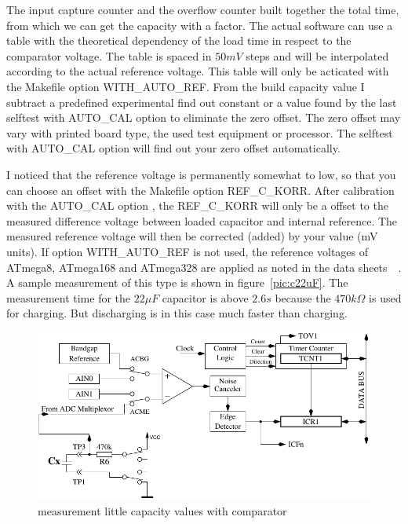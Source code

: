The input capture counter and the overflow counter built together the total time,
from which we can get the capacity with a factor.
The actual software can use a table with the theoretical  dependency of the load time in respect to the comparator voltage.
The table is spaced in \(50mV\) steps and will be interpolated according to the actual reference voltage. 
This table will only be acticated with the Makefile option WITH\_AUTO\_REF.
From the build capacity value I subtract a predefined experimental find out constant or a value found by the last selftest
with AUTO\_CAL option to eliminate the zero offset. 
The zero offset may vary with printed board type, the used test equipment or processor.
The selftest with AUTO\_CAL option will find out your zero offset automatically.

I noticed that the reference voltage is permanently somewhat to low,
 so that you can choose an offset with the Makefile option REF\_C\_KORR.
After calibration with the AUTO\_CAL option , the REF\_C\_KORR will only be a offset to the measured difference voltage
between loaded capacitor and internal reference.
The measured reference voltage will then be corrected (added) by your value (mV units).
If option WITH\_AUTO\_REF is not used, the reference voltages of ATmega8, ATmega168 and ATmega328
are applied as noted in the data sheets~\cite{ATmega8}~\cite{ATmega168}. 
A sample measurement of this type is shown in figure~\ref{pic:c22uF}.
The measurement time for the \(22\mu F\) capacitor is above \(2.6s\) because the \(470k\Omega\) is
used for charging. But discharging is in this case much faster than charging.

\begin{figure}[H]
\centering
\includegraphics[]{../FIG/Comparat.pdf}
\caption{measurement little capacity values with comparator}
\label{fig:comparat}
\end{figure}

